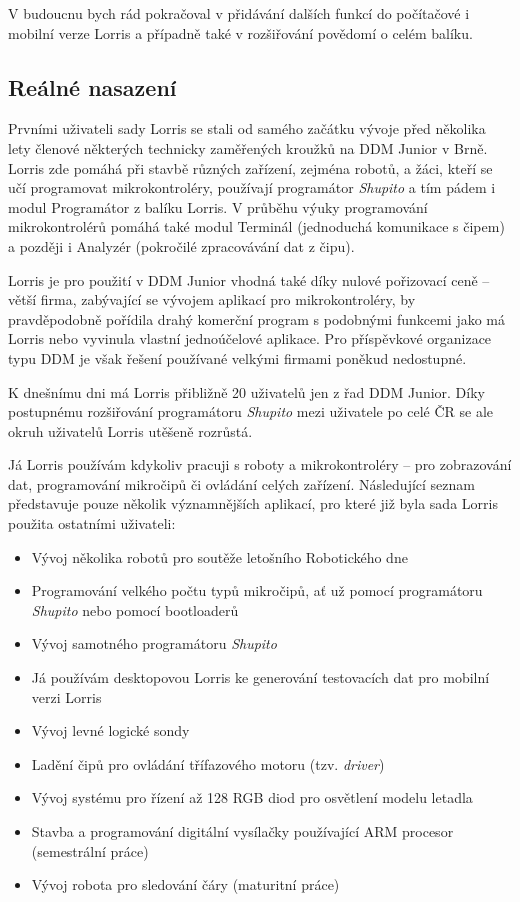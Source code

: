 \documentclass[12pt, a4paper, oneside]{article}
\newcommand{\It}{\textit}  %
\begin{document}
V budoucnu bych rád pokračoval v přidávání dalších funkcí do počítačové i mobilní verze Lorris a případně také v rozšiřování povědomí o celém balíku.


\subsection*{Reálné nasazení}
\label{usage}
Prvními uživateli sady Lorris se stali od samého začátku vývoje před několika lety členové některých technicky zaměřených kroužků na DDM Junior\cite{junior} v Brně. Lorris zde pomáhá při stavbě různých zařízení, zejména robotů, a žáci, kteří se učí programovat mikrokontroléry, používají programátor \It{Shupito} a tím pádem i modul Programátor z balíku Lorris. V průběhu výuky programování mikrokontrolérů pomáhá také modul Terminál (jednoduchá komunikace s čipem) a později i Analyzér (pokročilé zpracovávání dat z čipu).

Lorris je pro použití v DDM Junior vhodná také díky nulové pořizovací ceně -- větší firma, zabývající se vývojem aplikací pro mikrokontroléry, by pravděpodobně pořídila drahý komerční program s podobnými funkcemi jako má Lorris nebo vyvinula vlastní jednoúčelové aplikace. Pro příspěvkové organizace typu DDM je však řešení používané velkými firmami poněkud nedostupné.

K dnešnímu dni má Lorris přibližně 20 uživatelů jen z řad DDM Junior. Díky postupnému rozšiřování programátoru \It{Shupito} mezi uživatele po celé ČR se ale okruh uživatelů Lorris utěšeně rozrůstá.

\vspace{10mm}

\noindent Já Lorris používám kdykoliv pracuji s roboty a mikrokontroléry -- pro zobrazování dat, programování mikročipů či ovládání celých zařízení. Následující seznam představuje pouze několik významnějších aplikací, pro které již byla sada Lorris použita ostatními uživateli:
\begin{itemize}
    \item Vývoj několika robotů pro soutěže letošního Robotického dne\cite{rob_den_new}
    \item Programování velkého počtu typů mikročipů, ať už pomocí programátoru \It{Shupito} nebo pomocí bootloaderů
    \item Vývoj samotného programátoru \It{Shupito}
    \item Já používám desktopovou Lorris ke generování testovacích dat pro mobilní verzi Lorris
    \item Vývoj levné logické sondy
    \item Ladění čipů pro ovládání třífazového motoru (tzv. \It{driver})
    \item Vývoj systému pro řízení až 128 RGB diod pro osvětlení modelu letadla
    \item Stavba a programování digitální vysílačky používající ARM procesor (semestrální práce)
    \item Vývoj robota pro sledování čáry (maturitní práce)
\end{itemize}
\end{document}
